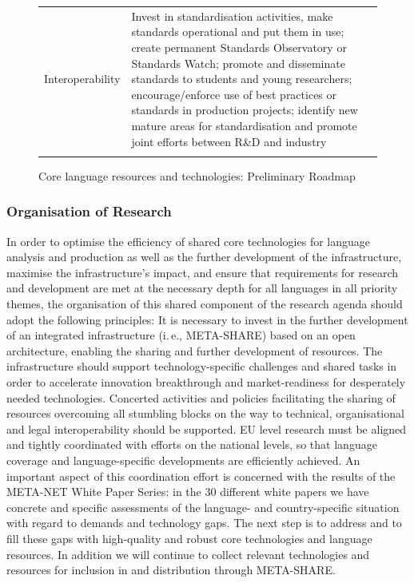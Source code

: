 \documentclass[10pt, plain]{../../metanetpaper}
\begin{document}
\begin{multicols}{2}
\begin{figure}[htbp]
\begin{tabular}{@{}p{2.5cm}p{8cm}p{4cm}@{}}
    Interoperability & Invest in standardisation activities, make standards operational and put them in use; create permanent Standards Observatory or Standards Watch; promote and disseminate standards to students and young researchers; encourage/enforce use of best practices or standards in production projects; identify new mature areas for standardisation and promote joint efforts between R\&D and industry & \\ \addlinespace\bottomrule
  \end{tabular}
  \caption{Core language resources and technologies: Preliminary Roadmap}
  \label{fig:lrlt-roadmap}
\end{figure}

\subsubsection{Organisation of Research}
\label{sec:org-research-pt4}

In order to optimise the efficiency of shared core technologies for language analysis and production as well as the further development of the infrastructure, maximise the infrastructure's impact, and ensure that requirements for research and development are met at the necessary depth for all languages in all priority themes, the organisation of this shared component of the research agenda should adopt the following principles: It is necessary to invest in the further development of an integrated infrastructure (i.\,e., META-SHARE) based on an open architecture, enabling the sharing and further development of resources. The infrastructure should support technology-specific challenges and shared tasks in order to accelerate innovation breakthrough and market-readiness for desperately needed technologies. Concerted activities and policies facilitating the sharing of resources overcoming all stumbling blocks on the way to technical, organisational and legal interoperability should be supported. EU level research must be aligned and tightly coordinated with efforts on the national levels, so that language coverage and language-specific developments are efficiently achieved. An important aspect of this coordination effort is concerned with the results of the META-NET White Paper Series: in the 30 different white papers we have concrete and specific assessments of the language- and country-specific situation with regard to demands and technology gaps. The next step is to address and to fill these gaps with high-quality and robust core technologies and language resources. In addition we will continue to collect relevant technologies and resources for inclusion in and distribution through META-SHARE.


\end{multicols}
\end{document}
